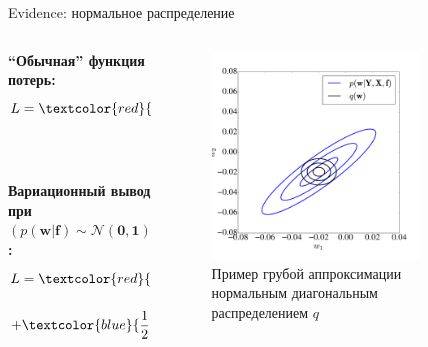 \documentclass[10pt,pdf,utf8,russian,aspectratio=169]{beamer}
\begin{document}
\begin{frame}{Evidence: нормальное распределение}
\begin{columns}[T] 
\begin{column}{.48\textwidth}
\textbf{``Обычная'' функция потерь:}\\
$$
L = \textcolor{red}{\sum_{\mathbf{x}, \mathbf{y} \in \mathfrak{D}} - \text{log}p(\mathbf{y}|\mathbf{x}, \mathbf{w})} + \textcolor{blue}{\lambda||\mathbf{w}||_2^2}.
$$\\~\\

\textbf{Вариационный вывод при $(p(\mathbf{w}|\mathbf{f}) \sim \mathcal{N}(\mathbf{0}, \mathbf{1}))$:}\\
$$
L =   \textcolor{red}{\sum_{\mathbf{x}, \mathbf{y}} \text{log}~p(\mathbf{y}|\mathbf{x}, \hat{\mathbf{w}})} +
$$
$$ + \textcolor{blue}{\frac{1}{2} \bigl( \text{tr} (\mathbf{A}_q) + \boldsymbol{\mu}_q^\text{T}\mathbf{A}^{-1}\boldsymbol{\mu}_q  - \text{ln}~|\mathbf{A}_q| \bigr)}.
$$\\~\\

\end{column}%
\hfill%
\begin{column}{.48\textwidth}

\begin{center}
\begin{figure}
\caption*{Пример грубой аппроксимации нормальным диагональным распределением $q$}
\includegraphics[width=0.8\textwidth]{mf.pdf}
\end{figure}
\end{center}

\end{column}%
\end{columns}

\end{frame}
\end{document}
